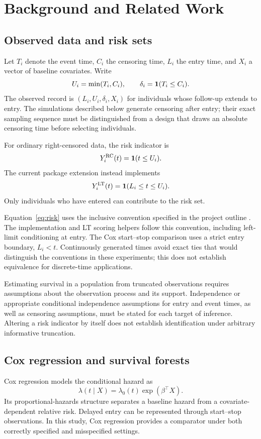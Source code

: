 \chapter{Background and Related Work}
\section{Observed data and risk sets}
Let $T_i$ denote the event time, $C_i$ the censoring time, $L_i$ the entry time,
and $X_i$ a vector of baseline covariates. Write
\[
 U_i=\min(T_i,C_i),\qquad \delta_i=\mathbf{1}(T_i\leq C_i).
\]
The observed record is $(L_i,U_i,\delta_i,X_i)$ for individuals whose follow-up
extends to entry. The simulations described below generate censoring after
entry; their exact sampling sequence must be distinguished from a design
that draws an absolute censoring time before selecting individuals.

For ordinary right-censored data, the risk indicator is
\[
 Y_i^{\mathrm{RC}}(t)=\mathbf{1}(t\leq U_i).
\]
The current package extension instead implements
\begin{equation}\label{eq:risk}
 Y_i^{\mathrm{LT}}(t)=\mathbf{1}(L_i\leq t\leq U_i).
\end{equation}
Only individuals who have entered can contribute to the risk set.

Equation~\eqref{eq:risk} uses the inclusive convention specified in the
project outline \citep{projectoutline}. The implementation and LT scoring
helpers follow this convention, including left-limit conditioning at entry.
The Cox start--stop comparison uses a strict entry boundary, $L_i<t$.
Continuously generated times avoid exact ties that would distinguish the
conventions in these experiments; this does not establish equivalence for
discrete-time applications.

Estimating survival in a population from truncated observations requires
assumptions about the observation process and its support. Independence or
appropriate conditional independence assumptions for entry and event times,
as well as censoring assumptions, must be stated for each target of inference.
Altering a risk indicator by itself does not establish identification under
arbitrary informative truncation.

\section{Cox regression and survival forests}
Cox regression models the conditional hazard as
\[
 \lambda(t\mid X)=\lambda_0(t)\exp(\beta^\top X).
\]
Its proportional-hazards structure separates a baseline hazard from a
covariate-dependent relative risk. Delayed entry can be represented through
start--stop observations. In this study, Cox regression provides a comparator
under both correctly specified and misspecified settings.

